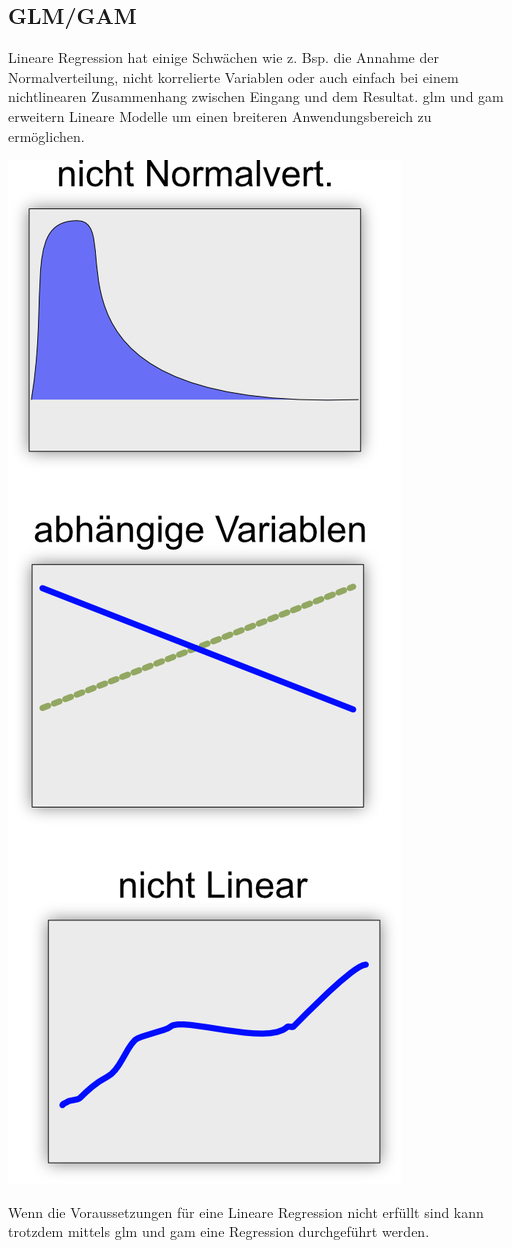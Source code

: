 \documentclass[
  12pt, %
  a4paper, %
  oneside, %
  openany, 
  numbers=noenddot, %
  BCOR=5mm, %
  parskip=half*, %
  thesis, %
]{bfhbook}
\begin{document}
\subsection{GLM/GAM}
\label{gam}
Lineare Regression hat einige Schwächen wie z. Bsp. die Annahme der Normalverteilung, nicht korrelierte Variablen oder auch einfach bei einem nichtlinearen Zusammenhang zwischen Eingang und dem Resultat. \acrfull{glm} und \acrfull{gam} erweitern Lineare Modelle um einen breiteren Anwendungsbereich zu ermöglichen.
\begin{center}
\begin{minipage}[t]{0.45\linewidth}
\vspace{0pt}
\includegraphics[width=0.6\linewidth]{Bilder/Regressions-Auschluss-Bedingungen.png}
\end{minipage}\hfill
\begin{minipage}[t]{0.45\linewidth}
\vspace{0pt}
Wenn die Voraussetzungen für eine Lineare Regression nicht erfüllt sind kann trotzdem mittels \Gls{glm} und \Gls{gam} eine Regression durchgeführt werden.
\end{minipage}
\end{center}
\end{document}
